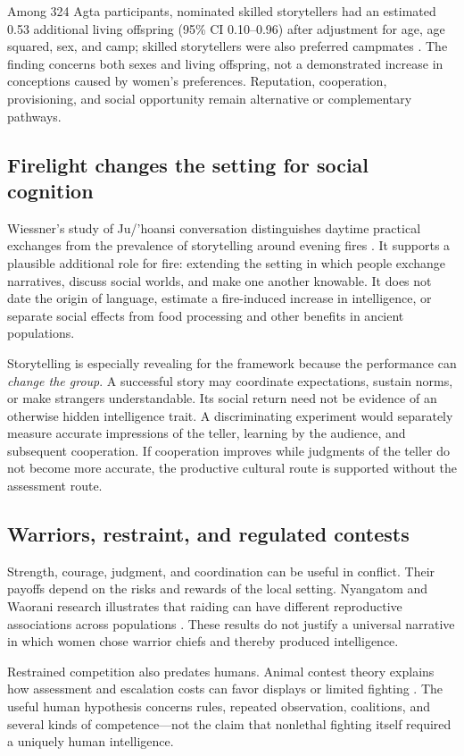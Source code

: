 \documentclass[10pt,twocolumn,letterpaper]{article}
\begin{document}
Among 324 Agta participants, nominated skilled storytellers had an estimated 0.53 additional living offspring (95\% CI 0.10--0.96) after adjustment for age, age squared, sex, and camp; skilled storytellers were also preferred campmates \citep{story}. The finding concerns both sexes and living offspring, not a demonstrated increase in conceptions caused by women's preferences. Reputation, cooperation, provisioning, and social opportunity remain alternative or complementary pathways.

\subsection{Firelight changes the setting for social cognition}
Wiessner's study of Ju/'hoansi conversation distinguishes daytime practical exchanges from the prevalence of storytelling around evening fires \citep{wiessner2014}. It supports a plausible additional role for fire: extending the setting in which people exchange narratives, discuss social worlds, and make one another knowable. It does not date the origin of language, estimate a fire-induced increase in intelligence, or separate social effects from food processing and other benefits in ancient populations.

Storytelling is especially revealing for the framework because the performance can \emph{change the group}. A successful story may coordinate expectations, sustain norms, or make strangers understandable. Its social return need not be evidence of an otherwise hidden intelligence trait. A discriminating experiment would separately measure accurate impressions of the teller, learning by the audience, and subsequent cooperation. If cooperation improves while judgments of the teller do not become more accurate, the productive cultural route is supported without the assessment route.

\subsection{Warriors, restraint, and regulated contests}
Strength, courage, judgment, and coordination can be useful in conflict. Their payoffs depend on the risks and rewards of the local setting. Nyangatom and Waorani research illustrates that raiding can have different reproductive associations across populations \citep{glowacki,beckerman}. These results do not justify a universal narrative in which women chose warrior chiefs and thereby produced intelligence.

Restrained competition also predates humans. Animal contest theory explains how assessment and escalation costs can favor displays or limited fighting \citep{maynardsmith}. The useful human hypothesis concerns rules, repeated observation, coalitions, and several kinds of competence---not the claim that nonlethal fighting itself required a uniquely human intelligence.
\end{document}
